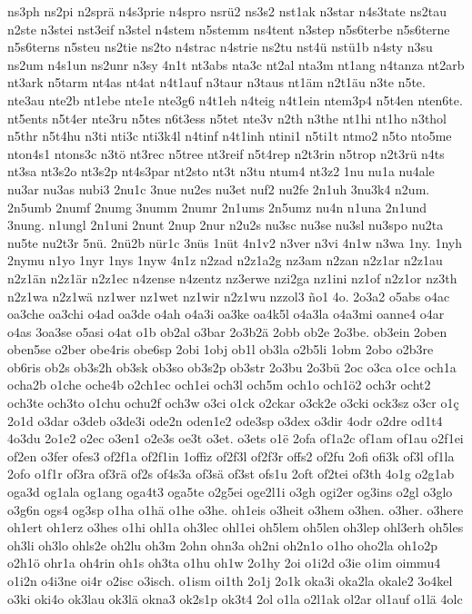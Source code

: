 {ns3ph
ns2pi
n2sprä
n4s3prie
n4spro
nsrü2
ns3s2
nst1ak
n3star
n4s3tate
ns2tau
n2ste
n3stei
nst3eif
n3stel
n4stem
n5stemm
ns4tent
n3step
n5s6terbe
n5s6terne
n5s6terns
n5steu
ns2tie
ns2to
n4strac
n4strie
ns2tu
nst4ü
nstü1b
n4sty
n3su
ns2um
n4s1un
ns2unr
n3sy
4n1t
nt3abs
nta3c
nt2al
nta3m
nt1ang
n4tanza
nt2arb
nt3ark
n5tarm
nt4as
nt4at
n4t1auf
n3taur
n3taus
nt1äm
n2t1äu
n3te
n5te.
nte3au
nte2b
nt1ebe
nte1e
nte3g6
n4t1eh
n4teig
n4t1ein
ntem3p4
n5t4en
nten6te.
nt5ents
n5t4er
nte3ru
n5tes
n6t3ess
n5tet
nte3v
n2th
n3the
nt1hi
nt1ho
n3thol
n5thr
n5t4hu
n3ti
nti3c
nti3k4l
n4tinf
n4t1inh
ntini1
n5ti1t
ntmo2
n5to
nto5me
nton4s1
ntons3c
n3tö
nt3rec
n5tree
nt3reif
n5t4rep
n2t3rin
n5trop
n2t3rü
n4ts
nt3sa
nt3s2o
nt3s2p
nt4s3par
nt2sto
nt3t
n3tu
ntum4
nt3z2
1nu
nu1a
nu4ale
nu3ar
nu3as
nubi3
2nu1c
3nue
nu2es
nu3et
nuf2
nu2fe
2n1uh
3nu3k4
n2um.
2n5umb
2numf
2numg
3numm
2numr
2n1ums
2n5umz
nu4n
n1una
2n1und
3nung.
n1ungl
2n1uni
2nunt
2nup
2nur
n2u2s
nu3sc
nu3se
nu3sl
nu3spo
nu2ta
nu5te
nu2t3r
5nü.
2nü2b
nür1c
3nüs
1nüt
4n1v2
n3ver
n3vi
4n1w
n3wa
1ny.
1nyh
2nymu
n1yo
1nyr
1nys
1nyw
4n1z
n2zad
n2z1a2g
nz3am
n2zan
n2z1ar
n2z1au
n2z1än
n2z1är
n2z1ec
n4zense
n4zentz
nz3erwe
nzi2ga
nz1ini
nz1of
n2z1or
nz3th
n2z1wa
n2z1wä
nz1wer
nz1wet
nz1wir
n2z1wu
nzzol3
ño1
4o.
2o3a2
o5abs
o4ac
oa3che
oa3chi
o4ad
oa3de
o4ah
o4a3i
oa3ke
oa4k5l
o4a3la
o4a3mi
oanne4
o4ar
o4as
3oa3se
o5asi
o4at
o1b
ob2al
o3bar
2o3b2ä
2obb
ob2e
2o3be.
ob3ein
2oben
oben5se
o2ber
obe4ris
obe6sp
2obi
1obj
ob1l
ob3la
o2b5li
1obm
2obo
o2b3re
ob6ris
ob2s
ob3s2h
ob3sk
ob3so
ob3s2p
ob3str
2o3bu
2o3bü
2oc
o3ca
o1ce
och1a
ocha2b
o1che
oche4b
o2ch1ec
och1ei
och3l
och5m
och1o
och1ö2
och3r
ocht2
och3te
och3to
o1chu
ochu2f
och3w
o3ci
o1ck
o2ckar
o3ck2e
o3cki
ock3sz
o3cr
o1ç
2o1d
o3dar
o3deb
o3de3i
ode2n
oden1e2
ode3sp
o3dex
o3dir
4odr
o2dre
od1t4
4o3du
2o1e2
o2ec
o3en1
o2e3s
oe3t
o3et.
o3ets
o1ë
2ofa
of1a2c
of1am
of1au
o2f1ei
of2en
o3fer
ofes3
of2f1a
of2f1in
1offiz
of2f3l
of2f3r
offs2
of2fu
2ofi
ofi3k
of3l
of1la
2ofo
o1f1r
of3ra
of3rä
of2s
of4s3a
of3sä
of3st
ofs1u
2oft
of2tei
of3th
4o1g
o2g1ab
oga3d
og1ala
og1ang
oga4t3
oga5te
o2g5ei
oge2l1i
o3gh
ogi2er
og3ins
o2gl
o3glo
o3g6n
ogs4
og3sp
o1ha
o1hä
o1he
o3he.
oh1eis
o3heit
o3hem
o3hen.
o3her.
o3here
oh1ert
oh1erz
o3hes
o1hi
ohl1a
oh3lec
ohl1ei
oh5lem
oh5len
oh3lep
ohl3erh
oh5les
oh3li
oh3lo
ohls2e
oh2lu
oh3m
2ohn
ohn3a
oh2ni
oh2n1o
o1ho
oho2la
oh1o2p
o2h1ö
ohr1a
oh4rin
oh1s
oh3ta
o1hu
oh1w
2o1hy
2oi
o1i2d
o3ie
o1im
oimmu4
o1i2n
o4i3ne
oi4r
o2isc
o3isch.
o1ism
oi1th
2o1j
2o1k
oka3i
oka2la
okale2
3o4kel
o3ki
oki4o
ok3lau
ok3lä
okna3
ok2s1p
ok3t4
2ol
o1la
o2l1ak
ol2ar
ol1auf
o1lä
4olc
}
